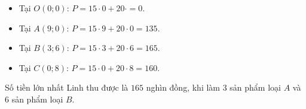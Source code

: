 \begin{bt}
{\begin{center}
			\end{center}
			\begin{itemize}
				\item Tại $ O(0;0) $: $ P = 15\cdot 0 + 20\cdot = 0$.
				\item Tại $A(9; 0) $: $ P = 15\cdot 9 + 20\cdot 0 = 135 $.
				\item Tại $B(3; 6) $: $ P = 15\cdot 3 + 20\cdot 6  = 165 $.
				\item Tại $C(0; 8) $: $ P = 15\cdot 0 + 20\cdot 8 = 160 $.
			\end{itemize}
			Số tiền lớn nhất Linh thu được là $165$ nghìn đồng, khi làm $3$ sản phẩm loại $ A $ và $6$ sản phẩm loại $ B $.
		}
	\end{bt}

